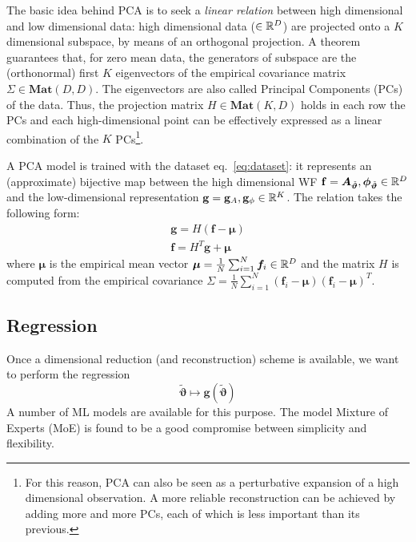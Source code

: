 The basic idea behind PCA is to seek a \textit{linear relation} between high dimensional and low dimensional data: high dimensional data ($\in \mathbb{R}^D$) are projected onto a $K$ dimensional subspace, by means of an orthogonal projection.
A theorem \cite[sec. 12.2.1]{murphy2012machine} guarantees that, for zero mean data, the generators of subspace are the (orthonormal) first $K$ eigenvectors of the empirical covariance matrix $\Sigma \in \mathbf{Mat}(D,D)$. The eigenvectors are also called Principal Components (PCs) of the data.
Thus, the projection matrix $H\in \mathbf{Mat}(K,D)$ holds in each row the PCs and each high-dimensional point can be effectively expressed as a linear combination of the $K$ PCs\footnote{For this reason, PCA can also be seen as a perturbative expansion of a high dimensional observation. A more reliable reconstruction can be achieved by adding more and more PCs, each of which is less important than its previous.}.

A PCA model is trained with the dataset eq.~\eqref{eq:dataset}: it represents an (approximate) bijective map between the high dimensional WF $\mathbf{f} = \boldsymbol{A}_{\tilde{\boldsymbol{\vartheta}}}, \boldsymbol{\phi}_{\tilde{\boldsymbol{\vartheta}}} \in \mathbb{R}^D$ and the low-dimensional representation $\mathbf{g} = \mathbf{g}_A , \mathbf{g}_\phi \in \mathbb{R}^K$.
The relation takes the following form:
\begin{align}
	\mathbf{g} = H (\mathbf{f} - \boldsymbol{\mu}) \label{eq:PCA_reduction_model}\\
	\mathbf{f} = H^T \mathbf{g} + \boldsymbol{\mu} \label{eq:PCA_reconstruction_model}
\end{align}
where $\boldsymbol{\mu}$ is the empirical mean vector ${\boldsymbol{\mu} = \frac{1}{N} \sum_{i=1}^N \boldsymbol{f}_i \in \mathbb{R}^D}$ and the matrix $H$ is computed from the empirical covariance ${\Sigma = \frac{1}{N} \sum_{i=1}^N (\mathbf{f}_i-\boldsymbol{\mu}) (\mathbf{f}_i-\boldsymbol{\mu})^T}$.


\subsection{Regression}
Once a dimensional reduction (and reconstruction) scheme is available, we want to perform the regression
\begin{equation} \label{eq:regression_model}
	{\tilde{\boldsymbol{\vartheta}}} \longmapsto \boldsymbol{g}({\tilde{\boldsymbol{\vartheta}}})
\end{equation}
A number of ML models are available for this purpose. The model Mixture of Experts (MoE) \cite{Jacobs1991AdaptiveMoE} \cite[ch. 11]{murphy2012machine} is found to be a good compromise between simplicity and flexibility.

